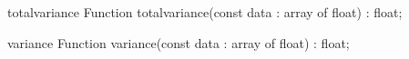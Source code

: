 \FPCexample{}


\begin{function}{totalvariance}
\Declaration
Function totalvariance(const data : array of float) : float;
\Description

\Errors
\SeeAlso
\end{function}

\FPCexample{}


\begin{function}{variance}
\Declaration
Function variance(const data : array of float) : float;
\Description

\Errors
\SeeAlso
\end{function}

\FPCexample{}

